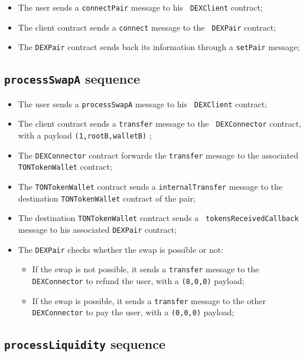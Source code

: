 \begin{itemize}
\item The user sends a {\tt connectPair} message to his {\tt
  DEXClient} contract;
\item The client contract sends a {\tt connect} message to the {\tt
  DEXPair} contract;
\item The {\tt DEXPair} contract sends back its information through a
  {\tt setPair} message;
\end{itemize}

\subsection{{\tt processSwapA} sequence}

\begin{itemize}
\item The user sends a {\tt processSwapA} message to his {\tt
  DEXClient} contract;
\item The client contract sends a {\tt transfer} message to the {\tt
  DEXConnector} contract, with a payload {\tt (1,rootB,walletB)} ;
\item The {\tt DEXConnector} contract forwards the {\tt transfer}
  message to the associated {\tt TONTokenWallet} contract;
\item The {\tt TONTokenWallet} contract sends a {\tt internalTransfer}
  message to the destination {\tt TONTokenWallet} contract of the
  pair;
\item The destination {\tt TONTokenWallet} contract sends a {\tt
  tokensReceivedCallback} message to his associated {\tt DEXPair}
  contract;
\item The {\tt DEXPair} checks whether the swap is possible or not:
  \begin{itemize}
  \item If the swap is not possible, it sends a {\tt transfer} message
    to the {\tt DEXConnector} to refund the user, with a {\tt (8,0,0)}
    payload;
  \item If the swap is possible, it sends a {\tt transfer} message to
    the other {\tt DEXConnector} to pay the user, with a {\tt (0,0,0)}
    payload;
  \end{itemize}
\end{itemize}

\subsection{{\tt processLiquidity} sequence}

